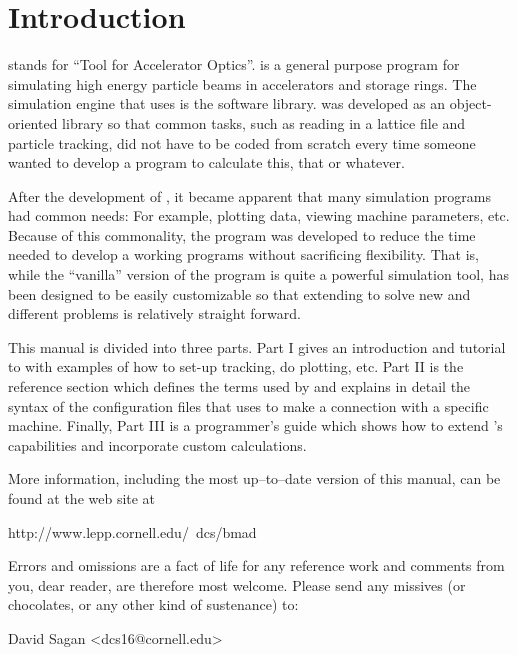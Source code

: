 \section*{Introduction}

\tao stands for ``Tool for Accelerator Optics''. \tao is a general
purpose program for simulating high energy particle beams in
accelerators and storage rings. The simulation engine that \tao uses
is the \bmad software library\cite{b:bmad}. \bmad was developed as an
object-oriented library so that common tasks, such as reading in a
lattice file and particle tracking, did not have to be coded from
scratch every time someone wanted to develop a program to calculate
this, that or whatever.

After the development of \bmad, it became apparent that many simulation
programs had common needs: For example, plotting data, viewing machine
parameters, etc. Because of this commonality, the \tao program was
developed to reduce the time needed to develop a working programs
without sacrificing flexibility. That is, while the ``vanilla''
version of the \tao program is quite a powerful simulation tool, \tao
has been designed to be easily customizable so that extending \tao to
solve new and different problems is relatively straight forward.

This manual is divided into three parts. Part I gives an introduction
and tutorial to \tao with examples of how to set-up tracking, do plotting,
etc. Part II is the reference section which defines the terms used by
\tao and explains in detail the syntax of the configuration files that
\tao uses to make a connection with a specific machine. Finally, Part
III is a programmer's guide which shows how to extend \tao's capabilities
and incorporate custom calculations.

More information, including the most up--to--date version of this
manual, can be found at the \bmad web site at
\begin{example}
  http://www.lepp.cornell.edu/~dcs/bmad
\end{example}

Errors and omissions are a fact of life for any reference work and
comments from you, dear reader, are therefore most welcome. Please
send any missives (or chocolates, or any other kind of sustenance) to:
\begin{example}
  David Sagan <dcs16@cornell.edu>
\end{example}
